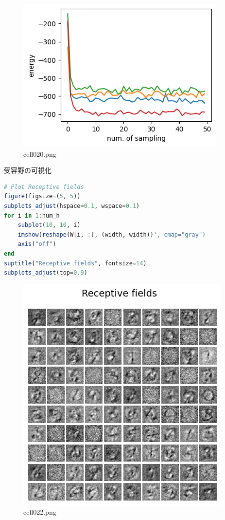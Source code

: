 \begin{figure}[ht]
	\centering
	\includegraphics[scale=0.8, max width=\linewidth]{./fig/energy-based-model/boltzmann-machine/cell020.png}
	\caption{cell020.png}
	\label{cell020.png}
\end{figure}
受容野の可視化
\begin{lstlisting}[language=julia]
# Plot Receptive fields
figure(figsize=(5, 5))
subplots_adjust(hspace=0.1, wspace=0.1)
for i in 1:num_h
    subplot(10, 10, i)
    imshow(reshape(W[i, :], (width, width))', cmap="gray")
    axis("off")
end
suptitle("Receptive fields", fontsize=14)
subplots_adjust(top=0.9)
\end{lstlisting}
\begin{figure}[ht]
	\centering
	\includegraphics[scale=0.8, max width=\linewidth]{./fig/energy-based-model/boltzmann-machine/cell022.png}
	\caption{cell022.png}
	\label{cell022.png}
\end{figure}
